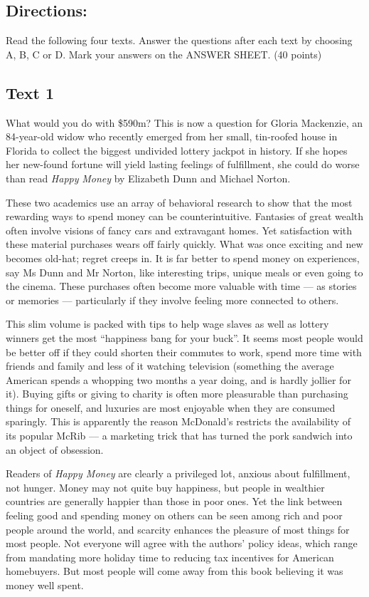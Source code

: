 \documentclass[UTF8,11pt]{ctexart}
\begin{document}
\subsection*{\textbf{Directions:}}


Read the following four texts. Answer the questions after each text by choosing A, B, C or D. Mark your answers on the ANSWER SHEET. (40 points)


\subsection*{\textbf{Text 1}}


What would you do with \$590m? This is now a question for Gloria Mackenzie, an 84-year-old widow who recently emerged from her small, tin-roofed house in Florida to collect the biggest undivided lottery jackpot in history. If she hopes her new-found fortune will yield lasting feelings of fulfillment, she could do worse than read \textit{Happy} \textit{Money} by Elizabeth Dunn and Michael Norton.


These two academics use an array of behavioral research to show that the most rewarding ways to spend money can be counterintuitive. Fantasies of great wealth often involve visions of fancy cars and extravagant homes. Yet satisfaction with these material purchases wears off fairly quickly. What was once exciting and new becomes old-hat; regret creeps in. It is far better to spend money on experiences, say Ms Dunn and Mr Norton, like interesting trips, unique meals or even going to the cinema. These purchases often become more valuable with time — as stories or memories — particularly if they involve feeling more connected to others.


This slim volume is packed with tips to help wage slaves as well as lottery winners get the most “happiness bang for your buck”. It seems most people would be better off if they could shorten their commutes to work, spend more time with friends and family and less of it watching television (something the average American spends a whopping two months a year doing, and is hardly jollier for it). Buying gifts or giving to charity is often more pleasurable than purchasing things for oneself, and luxuries are most enjoyable when they are consumed sparingly. This is apparently the reason McDonald’s restricts the availability of its popular McRib — a marketing trick that has turned the pork sandwich into an object of obsession.


Readers of \textit{Happy Money} are clearly a privileged lot, anxious about fulfillment, not hunger. Money may not quite buy happiness, but people in wealthier countries are generally happier than those in poor ones. Yet the link between feeling good and spending money on others can be seen among rich and poor people around the world, and scarcity enhances the pleasure of most things for most people. Not everyone will agree with the authors’ policy ideas, which range from mandating more holiday time to reducing tax incentives for American homebuyers. But most people will come away from this book believing it was money well spent.
\end{document}
